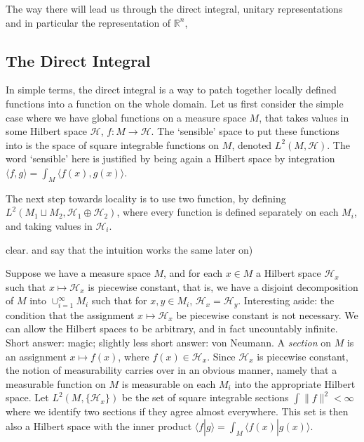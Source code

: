 \documentclass[
]{article}
\begin{document}
The way there will lead us through the direct integral, unitary
representations and in particular the representation of
\(\mathbb{R}^n\), 

\hypertarget{the-direct-integral}{%
\subsection{The Direct Integral}\label{the-direct-integral}}

In simple terms, the direct integral is a way to patch together locally
defined functions into a function on the whole domain. Let us first
consider the simple case where we have global functions on a measure
space \(M\), that takes values in some Hilbert space \(\mathscr{H}\),
\(f:M \rightarrow \mathscr{H}\). The `sensible' space to put these
functions into is the space of square integrable functions on \(M\),
denoted \(L^2(M, \mathscr{H})\). The word `sensible' here is justified
by being again a Hilbert space by integration
\(\langle f, g\rangle = \int_M\langle f(x), g(x)\rangle\).


The next step towards locality is to use two function, by defining
\(L^2(M_1 \sqcup M_2, \mathscr{H}_1 \oplus \mathscr{H}_2)\), where every
function is defined separately on each \(M_i\), and taking values in
\(\mathscr{H}_i\).


clear. and say that the intuition works the same later on)

Suppose we have a measure space \(M\), and for each \(x \in M\) a
Hilbert space \(\mathscr{H}_x\) such that \(x \mapsto \mathscr{H}_x\) is
piecewise constant, that is, we have a disjoint decomposition of \(M\)
into \(\cup_{i=1}^{\infty} M_i\) such that for \(x,y \in M_i\),
\(\mathscr{H}_x = \mathscr{H}_y\). 
Interesting aside: the condition that the assignment
\(x \mapsto \mathscr{H}_x\) be piecewise constant is not necessary. We
can allow the Hilbert spaces to be arbitrary, and in fact uncountably
infinite. Short answer: magic; slightly less short answer: von Neumann.
A \emph{section} on \(M\) is an assignment \(x \mapsto f(x)\), where
\(f(x) \in \mathscr{H}_x\). Since \(\mathscr{H}_x\) is piecewise
constant, the notion of measurability carries over in an obvious manner,
namely that a measurable function on \(M\) is measurable on each \(M_i\)
into the appropriate Hilbert space. Let \(L^2(M, \{\mathscr{H}_x\})\) be
the set of square integrable sections \(\int \| f \|^2 < \infty\) where
we identify two sections if they agree almost everywhere. This set is
then also a Hilbert space with the inner product
\(\langle f | g \rangle = \int_M \langle f(x) | g(x) \rangle\).
\end{document}
